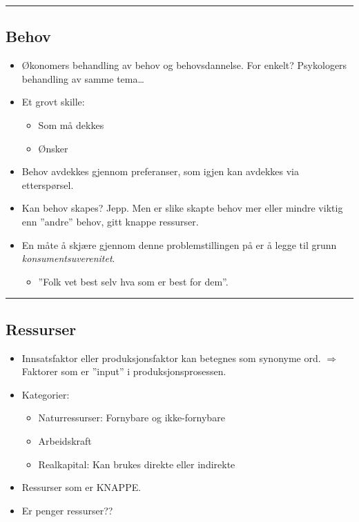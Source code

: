 \documentclass[
  letterpaper,
  DIV=11,
  numbers=noendperiod]{scrartcl}
\providecommand{\tightlist}{%
  \setlength{\itemsep}{0pt}\setlength{\parskip}{0pt}}\usepackage{longtable,booktabs,array}
\begin{document}
\begin{center}\rule{0.5\linewidth}{0.5pt}\end{center}

\subsection{Behov}\label{behov}

\begin{itemize}
\tightlist
\item
  Økonomers behandling av behov og behovsdannelse. For enkelt?
  Psykologers behandling av samme tema\ldots{}
\item
  Et grovt skille:

  \begin{itemize}
  \tightlist
  \item
    Som må dekkes
  \item
    Ønsker
  \end{itemize}
\item
  Behov avdekkes gjennom preferanser, som igjen kan avdekkes via
  etterspørsel.
\item
  Kan behov skapes? Jepp. Men er slike skapte behov mer eller mindre
  viktig enn ''andre'' behov, gitt knappe ressurser.
\item
  En måte å skjære gjennom denne problemstillingen på er å legge til
  grunn \emph{konsumentsuverenitet}.

  \begin{itemize}
  \tightlist
  \item
    ''Folk vet best selv hva som er best for dem''.
  \end{itemize}
\end{itemize}

\begin{center}\rule{0.5\linewidth}{0.5pt}\end{center}

\subsection{Ressurser}\label{ressurser}

\begin{itemize}
\tightlist
\item
  Innsatsfaktor eller produksjonsfaktor kan betegnes som synonyme ord.
  \(\Rightarrow\) Faktorer som er ''input'' i produksjonsprosessen.
\item
  Kategorier:

  \begin{itemize}
  \tightlist
  \item
    Naturressurser: Fornybare og ikke-fornybare
  \item
    Arbeidskraft
  \item
    Realkapital: Kan brukes direkte eller indirekte
  \end{itemize}
\item
  Ressurser som er KNAPPE.
\item
  Er penger ressurser??
\end{itemize}
\end{document}
